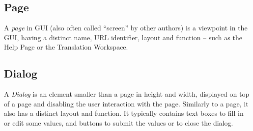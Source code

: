 \subsection*{Page}
A \emph{page} in GUI (also often called ``screen'' by other authors) is a viewpoint in the GUI, having a distinct name, URL identifier, layout and function -- such as the Help Page or the Translation Workspace.

\subsection*{Dialog}
A \emph{Dialog} is an element smaller than a page in height and width, displayed on top of a page and disabling the user interaction with the page. Similarly to a page, it also has a distinct layout and function. It typically contains text boxes to fill in or edit some values, and buttons to submit the values or to close the dialog.
